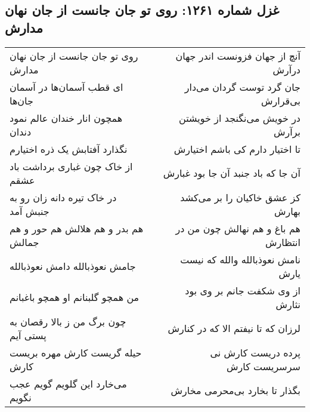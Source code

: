 \begin{center}
\section*{غزل شماره ۱۲۶۱: روی تو جان جانست از جان نهان مدارش}
\label{sec:1261}
\begin{longtable}{l p{0.5cm} r}
روی تو جان جانست از جان نهان مدارش
&&
آنچ از جهان فزونست اندر جهان درآرش
\\
ای قطب آسمان‌ها در آسمان جان‌ها
&&
جان گرد توست گردان می‌دار بی‌قرارش
\\
همچون انار خندان عالم نمود دندان
&&
در خویش می‌نگنجد از خویشتن برآرش
\\
نگذارد آفتابش یک ذره اختیارم
&&
تا اختیار دارم کی باشم اختیارش
\\
از خاک چون غباری برداشت باد عشقم
&&
آن جا که باد جنبد آن جا بود غبارش
\\
در خاک تیره دانه زان رو به جنبش آمد
&&
کز عشق خاکیان را بر می‌کشد بهارش
\\
هم بدر و هم هلالش هم حور و هم جمالش
&&
هم باغ و هم نهالش چون من در انتظارش
\\
جامش نعوذبالله دامش نعوذبالله
&&
نامش نعوذبالله والله که نیست یارش
\\
من همچو گلبنانم او همچو باغبانم
&&
از وی شکفت جانم بر وی بود نثارش
\\
چون برگ من ز بالا رقصان به پستی آیم
&&
لرزان که تا نیفتم الا که در کنارش
\\
حیله گریست کارش مهره بریست کارش
&&
پرده دریست کارش نی سرسریست کارش
\\
می‌خارد این گلویم گویم عجب نگویم
&&
بگذار تا بخارد بی‌محرمی مخارش
\\
\end{longtable}
\end{center}
